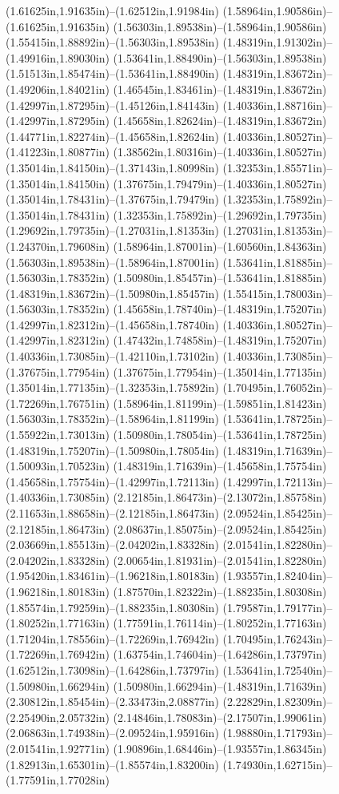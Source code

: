 (1.61625in,1.91635in)--(1.62512in,1.91984in) (1.58964in,1.90586in)--(1.61625in,1.91635in) (1.56303in,1.89538in)--(1.58964in,1.90586in) (1.55415in,1.88892in)--(1.56303in,1.89538in) (1.48319in,1.91302in)--(1.49916in,1.89030in) (1.53641in,1.88490in)--(1.56303in,1.89538in) (1.51513in,1.85474in)--(1.53641in,1.88490in) (1.48319in,1.83672in)--(1.49206in,1.84021in) (1.46545in,1.83461in)--(1.48319in,1.83672in) (1.42997in,1.87295in)--(1.45126in,1.84143in) (1.40336in,1.88716in)--(1.42997in,1.87295in) (1.45658in,1.82624in)--(1.48319in,1.83672in) (1.44771in,1.82274in)--(1.45658in,1.82624in) (1.40336in,1.80527in)--(1.41223in,1.80877in) (1.38562in,1.80316in)--(1.40336in,1.80527in) (1.35014in,1.84150in)--(1.37143in,1.80998in) (1.32353in,1.85571in)--(1.35014in,1.84150in) (1.37675in,1.79479in)--(1.40336in,1.80527in) (1.35014in,1.78431in)--(1.37675in,1.79479in) (1.32353in,1.75892in)--(1.35014in,1.78431in) (1.32353in,1.75892in)--(1.29692in,1.79735in) (1.29692in,1.79735in)--(1.27031in,1.81353in) (1.27031in,1.81353in)--(1.24370in,1.79608in) (1.58964in,1.87001in)--(1.60560in,1.84363in) (1.56303in,1.89538in)--(1.58964in,1.87001in) (1.53641in,1.81885in)--(1.56303in,1.78352in) (1.50980in,1.85457in)--(1.53641in,1.81885in) (1.48319in,1.83672in)--(1.50980in,1.85457in) (1.55415in,1.78003in)--(1.56303in,1.78352in) (1.45658in,1.78740in)--(1.48319in,1.75207in) (1.42997in,1.82312in)--(1.45658in,1.78740in) (1.40336in,1.80527in)--(1.42997in,1.82312in) (1.47432in,1.74858in)--(1.48319in,1.75207in) (1.40336in,1.73085in)--(1.42110in,1.73102in) (1.40336in,1.73085in)--(1.37675in,1.77954in) (1.37675in,1.77954in)--(1.35014in,1.77135in) (1.35014in,1.77135in)--(1.32353in,1.75892in) (1.70495in,1.76052in)--(1.72269in,1.76751in) (1.58964in,1.81199in)--(1.59851in,1.81423in) (1.56303in,1.78352in)--(1.58964in,1.81199in) (1.53641in,1.78725in)--(1.55922in,1.73013in) (1.50980in,1.78054in)--(1.53641in,1.78725in) (1.48319in,1.75207in)--(1.50980in,1.78054in) (1.48319in,1.71639in)--(1.50093in,1.70523in) (1.48319in,1.71639in)--(1.45658in,1.75754in) (1.45658in,1.75754in)--(1.42997in,1.72113in) (1.42997in,1.72113in)--(1.40336in,1.73085in) (2.12185in,1.86473in)--(2.13072in,1.85758in) (2.11653in,1.88658in)--(2.12185in,1.86473in) (2.09524in,1.85425in)--(2.12185in,1.86473in) (2.08637in,1.85075in)--(2.09524in,1.85425in) (2.03669in,1.85513in)--(2.04202in,1.83328in) (2.01541in,1.82280in)--(2.04202in,1.83328in) (2.00654in,1.81931in)--(2.01541in,1.82280in) (1.95420in,1.83461in)--(1.96218in,1.80183in) (1.93557in,1.82404in)--(1.96218in,1.80183in) (1.87570in,1.82322in)--(1.88235in,1.80308in) (1.85574in,1.79259in)--(1.88235in,1.80308in) (1.79587in,1.79177in)--(1.80252in,1.77163in) (1.77591in,1.76114in)--(1.80252in,1.77163in) (1.71204in,1.78556in)--(1.72269in,1.76942in) (1.70495in,1.76243in)--(1.72269in,1.76942in) (1.63754in,1.74604in)--(1.64286in,1.73797in) (1.62512in,1.73098in)--(1.64286in,1.73797in) (1.53641in,1.72540in)--(1.50980in,1.66294in) (1.50980in,1.66294in)--(1.48319in,1.71639in) (2.30812in,1.85454in)--(2.33473in,2.08877in) (2.22829in,1.82309in)--(2.25490in,2.05732in) (2.14846in,1.78083in)--(2.17507in,1.99061in) (2.06863in,1.74938in)--(2.09524in,1.95916in) (1.98880in,1.71793in)--(2.01541in,1.92771in) (1.90896in,1.68446in)--(1.93557in,1.86345in) (1.82913in,1.65301in)--(1.85574in,1.83200in) (1.74930in,1.62715in)--(1.77591in,1.77028in) 